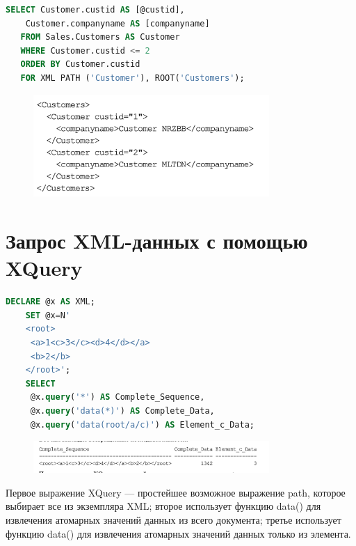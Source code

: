 \begin{lstlisting}[label=lst:funcReturn, language=sql]
	SELECT Customer.custid AS [@custid],
	Customer.companyname AS [companyname]
   FROM Sales.Customers AS Customer
   WHERE Customer.custid <= 2
   ORDER BY Customer.custid
   FOR XML PATH ('Customer'), ROOT('Customers'); 
\end{lstlisting}

\begin{figure}[h!]
	\begin{center}
		\includegraphics[width=0.8\textwidth]{img/xml.png}
	\end{center}
	\captionsetup{justification=centering}
\end{figure}


\section{Запрос XML-данных с помощью XQuery}

\begin{lstlisting}[label=lst:funcReturn, language=sql]
	DECLARE @x AS XML;
	SET @x=N'
	<root>
	 <a>1<c>3</c><d>4</d></a>
	 <b>2</b>
	</root>';
	SELECT
	 @x.query('*') AS Complete_Sequence,
	 @x.query('data(*)') AS Complete_Data,
	 @x.query('data(root/a/c)') AS Element_c_Data; 
\end{lstlisting}

\begin{figure}[h!]
	\begin{center}
		\includegraphics[width=0.8\textwidth]{img/xquery.png}
	\end{center}
	\captionsetup{justification=centering}
\end{figure}

Первое выражение XQuery — простейшее возможное выражение path, которое выбирает все из экземпляра XML; второе использует функцию data() для извлечения
атомарных значений данных из всего документа; третье использует функцию
data() для извлечения атомарных значений данных только из элемента. 


